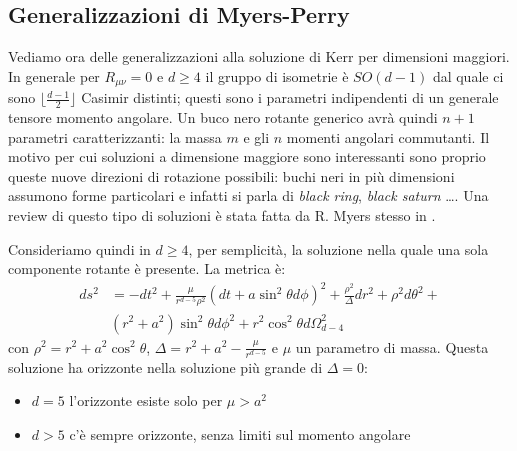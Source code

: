 \subsection{Generalizzazioni di Myers-Perry}
Vediamo ora delle generalizzazioni alla soluzione di Kerr per dimensioni maggiori. In generale per $R_{\mu\nu} =0 $ e $d \geq 4$ il gruppo di isometrie è $SO(d-1)$ dal quale ci sono $\lfloor\frac{d-1}{2}\rfloor$ Casimir distinti; questi sono i parametri indipendenti di un generale tensore momento angolare. Un buco nero rotante generico avrà quindi $n+1$ parametri caratterizzanti: la massa $m$ e gli $n$ momenti angolari commutanti.
Il motivo per cui soluzioni a dimensione maggiore sono interessanti sono proprio queste nuove direzioni di rotazione possibili: buchi neri in più dimensioni assumono forme particolari e infatti si parla di \textit{black ring}, \textit{black saturn} \dots. Una review di questo tipo di soluzioni è stata fatta da R. Myers stesso in \cite{myers}.

Consideriamo quindi in $d \geq 4$, per semplicità, la soluzione  nella quale una sola componente rotante è presente. La metrica è:
\begin{align}
    ds^2 &= -dt^2 + \frac{\mu}{r^{d-5}\rho^2}(dt + a\sin^2\theta d\phi)^2 + \frac{\rho^2}{\Delta}dr^2 + \rho^2d\theta^2 + \nonumber \\
    &(r^2 + a^2)\sin^2\theta d\phi^2 +r^2\cos^2\theta d\Omega^2_{d-4}
    \label{eq.metrica_myers_perry_singlespinning}
\end{align}
con $\rho^2 = r^2 +a^2\cos^2\theta$, $\Delta = r^2 + a^2 - \frac{\mu}{r^{d-5}}$ e $\mu$ un parametro di massa. Questa soluzione ha orizzonte nella soluzione più grande di $\Delta = 0$:
\begin{itemize}
    \item $d=5$ l'orizzonte esiste solo per $\mu > a^2$
    \item $d > 5$ c'è sempre orizzonte, senza limiti sul momento angolare
\end{itemize}

